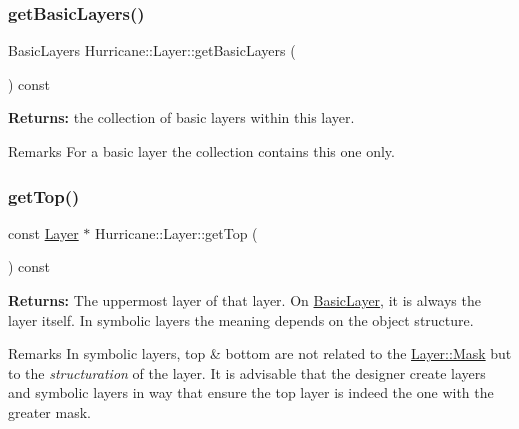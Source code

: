 \subsubsection{\texorpdfstring{get\+Basic\+Layers()}{getBasicLayers()}}
{\footnotesize\ttfamily Basic\+Layers Hurricane\+::\+Layer\+::get\+Basic\+Layers (\begin{DoxyParamCaption}{ }\end{DoxyParamCaption}) const\hspace{0.3cm}{\ttfamily [pure virtual]}}

{\bfseries Returns\+:} the collection of basic layers within this layer.

\begin{DoxyRemark}{Remarks}
For a basic layer the collection contains this one only. 
\end{DoxyRemark}
\mbox{\label{classHurricane_1_1Layer_a5f7c43a29f3dd02a9ebccbcbf91d6727}} 
\subsubsection{\texorpdfstring{get\+Top()}{getTop()}}
{\footnotesize\ttfamily const \mbox{\hyperlink{classHurricane_1_1Layer}{Layer}} $\ast$ Hurricane\+::\+Layer\+::get\+Top (\begin{DoxyParamCaption}{ }\end{DoxyParamCaption}) const\hspace{0.3cm}{\ttfamily [virtual]}}

{\bfseries Returns\+:} The uppermost layer of that layer. On \mbox{\hyperlink{classHurricane_1_1BasicLayer}{Basic\+Layer}}, it is always the layer itself. In symbolic layers the meaning depends on the object structure.

\begin{DoxyRemark}{Remarks}
In symbolic layers, top \& bottom are not related to the \mbox{\hyperlink{classHurricane_1_1Layer_af5277c670637bd5d910237e7afe01a91}{Layer\+::\+Mask}} but to the {\itshape structuration} of the layer. It is advisable that the designer create layers and symbolic layers in way that ensure the top layer is indeed the one with the greater mask. 
\end{DoxyRemark}
\mbox{\label{classHurricane_1_1Layer_a4dab4552a219d2d900ed0b1245dc6580}} 
